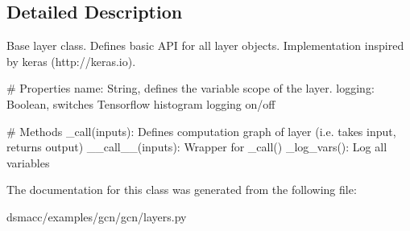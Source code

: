 \subsection{Detailed Description}
\begin{DoxyVerb}Base layer class. Defines basic API for all layer objects.
Implementation inspired by keras (http://keras.io).

# Properties
    name: String, defines the variable scope of the layer.
    logging: Boolean, switches Tensorflow histogram logging on/off

# Methods
    _call(inputs): Defines computation graph of layer
        (i.e. takes input, returns output)
    __call__(inputs): Wrapper for _call()
    _log_vars(): Log all variables
\end{DoxyVerb}
 

The documentation for this class was generated from the following file\+:\begin{DoxyCompactItemize}
\item 
dsmacc/examples/gcn/gcn/layers.\+py\end{DoxyCompactItemize}
